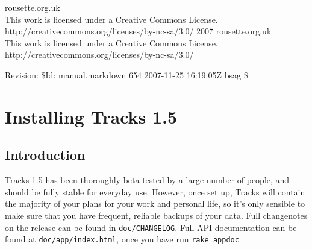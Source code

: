 \documentclass[10pt,twoside]{memoir}
\date{2007-11-25}
\title{\mytitle}
\author{\myauthor}
\def\mychapterstyle{BlueBox}
\def\mypagestyle{myruledpagestyle}
\def\revision{}
\def\mycopyright{2007 rousette.org.uk \\ This work is licensed under a Creative Commons License. \\ http://creativecommons.org/licenses/by-nc-sa/3.0/}
\def\revision{Revision: \$Id: manual.markdown 654 2007-11-25 16:19:05Z bsag \$}
\begin{document}
\chapterstyle{\mychapterstyle}
\pagestyle{\mypagestyle}

%
%

\frontmatter



\maketitle
\clearpage

\vspace*{\fill}

\setlength{\parindent}{0pt}

\ifx\mycopyright\undefined
\else
	\textcopyright{} \mycopyright
\fi

\revision

\begin{center}
\end{center}

\setlength{\parindent}{1em}
\clearpage

\tableofcontents


%
%


\setlength{\parindent}{0pt}
\setlength{\parskip}{\baselineskip/2}

\mainmatter
\chapter{Installing Tracks 1.5}
\label{installingtracks1.5}

\section{Introduction}
\label{introduction}

Tracks 1.5 has been thoroughly beta tested by a large number of people, and should be fully stable for everyday use. However, once set up, Tracks will contain the majority of your plans for your work and personal life, so it's only sensible to make sure that you have frequent, reliable backups of your data. Full changenotes on the release can be found in \texttt{doc/CHANGELOG}. Full API documentation can be found at \texttt{doc/app/index.html}, once you have run \texttt{rake appdoc}
\end{document}
